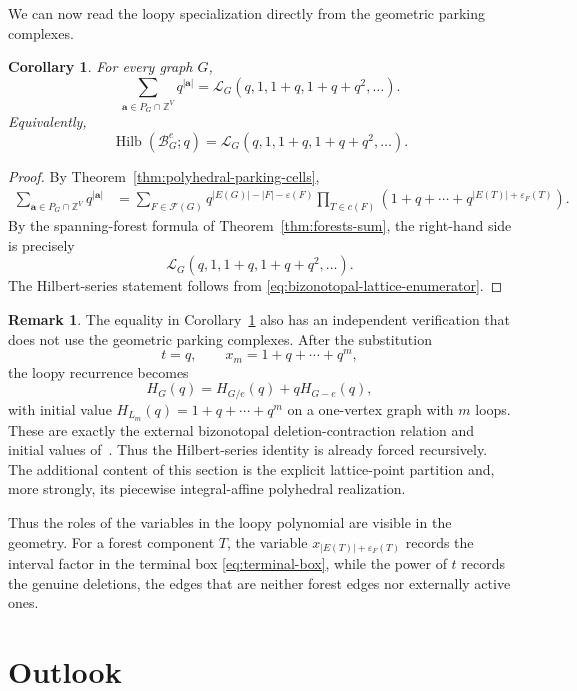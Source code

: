 \documentclass[11pt]{article}
\theoremstyle{plain}
\newtheorem{corollary}[theorem]{Corollary}
\theoremstyle{definition}
\newtheorem{remark}[theorem]{Remark}
\renewcommand{\mathcal}{\mathscr}
\newcommand{\LL}{\mathcal{L}}    %
\newcommand{\BZ}{\mathcal{B}}    %
\newcommand{\cF}{\mathcal{F}}    %
\newcommand{\ba}{\mathbf{a}}
\newcommand{\Hil}{\operatorname{Hilb}}
\newcommand{\eps}{\varepsilon}
\newcommand{\ZZ}{\mathbb Z}
\numberwithin{equation}{section}
\begin{document}
We can now read the loopy specialization directly from the geometric parking complexes.

\begin{corollary}\label{cor:polytope-specialization}
For every graph $G$,
\begin{equation}
   \sum_{\ba\in P_G\cap\ZZ^V}q^{|\ba|}
   =\LL_G(q,1,1+q,1+q+q^2,\ldots).
\label{eq:polytope-specialization}
\end{equation}
Equivalently,
\[
   \Hil(\BZ_G^e;q)
   =\LL_G(q,1,1+q,1+q+q^2,\ldots).
\]
\end{corollary}

\begin{proof}
By Theorem~\ref{thm:polyhedral-parking-cells},
\begin{align*}
 \sum_{\ba\in P_G\cap\ZZ^V}q^{|\ba|}
 &=\sum_{F\in\cF(G)}
   q^{|E(G)|-|F|-\eps(F)}
   \prod_{T\in c(F)}
   \left(1+q+\cdots+
   q^{|E(T)|+\eps_F(T)}\right).
\end{align*}
By the spanning-forest formula of Theorem~\ref{thm:forests-sum}, the right-hand side is precisely
\[
   \LL_G(q,1,1+q,1+q+q^2,\ldots).
\]
The Hilbert-series statement follows from
\eqref{eq:bizonotopal-lattice-enumerator}.
\end{proof}

\begin{remark}\label{rem:polytope-recursion-check}
The equality in Corollary~\ref{cor:polytope-specialization} also has an
independent verification that does not use the geometric parking complexes.
After the substitution
\[
   t=q,\qquad x_m=1+q+\cdots+q^m,
\]
the loopy recurrence becomes
\[
   H_G(q)=H_{G/e}(q)+qH_{G-e}(q),
\]
with initial value $H_{L_m}(q)=1+q+\cdots+q^m$ on a one-vertex graph with $m$
loops.  These are exactly the external bizonotopal deletion-contraction
relation and initial values of~\cite{KNSV}.  Thus the Hilbert-series identity is
already forced recursively.  The additional content of this section is the
explicit lattice-point partition and, more strongly, its piecewise
integral-affine polyhedral realization.
\end{remark}

Thus the roles of the variables in the loopy polynomial are visible in the geometry.
For a forest component $T$, the variable
$x_{|E(T)|+\eps_F(T)}$ records the interval factor in the terminal box
\eqref{eq:terminal-box}, while the power of $t$ records the genuine deletions,
the edges that are neither forest edges nor externally active ones.


\section{Outlook}\label{sec:outlook}
\end{document}
